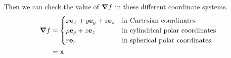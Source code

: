 Then we can check the value of $\grad f$ in these different coordinate systems.
\begin{align*}
	\grad f & = \begin{cases}
		x \vb e_x + y \vb e_y + z \vb e_z & \text{in Cartesian coordinates}         \\
		\rho \vb e_\rho + z \vb e_z       & \text{in cylindrical polar coordinates} \\
		r \vb e_r                         & \text{in spherical polar coordinates}   \\
	\end{cases} \\
	        & = \vb x
\end{align*}
